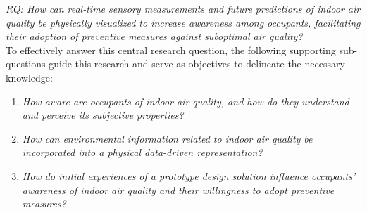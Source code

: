 \emph{RQ: How can real-time sensory measurements and future predictions of indoor air quality be physically visualized to increase awareness among occupants, facilitating their adoption of preventive measures against suboptimal air quality?}\label{rq:1} \\

To effectively answer this central research question, the following supporting sub-questions guide this research and serve as objectives to delineate the necessary knowledge: \\

\begin{enumerate}
    \renewcommand{\labelenumi}{SQ\arabic{enumi}:}
    \item \emph{How aware are occupants of indoor air quality, and how do they understand and perceive its subjective properties?}\label{subq:1}
    \item \emph{How can environmental information related to indoor air quality be incorporated into a physical data-driven representation?}\label{subq:2}
    \item \emph{How do initial experiences of a prototype design solution influence occupants’ awareness of indoor air quality and their willingness to adopt preventive measures?}\label{subq:3}\\
\end{enumerate}